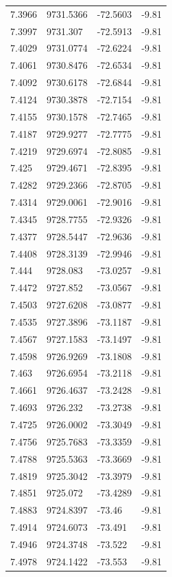 \begin{table}[H]
\begin{tabular}{llll}
7.3966 & 9731.5366 & -72.5603 & -9.81 \\
7.3997 & 9731.307 & -72.5913 & -9.81 \\
7.4029 & 9731.0774 & -72.6224 & -9.81 \\
7.4061 & 9730.8476 & -72.6534 & -9.81 \\
7.4092 & 9730.6178 & -72.6844 & -9.81 \\
7.4124 & 9730.3878 & -72.7154 & -9.81 \\
7.4155 & 9730.1578 & -72.7465 & -9.81 \\
7.4187 & 9729.9277 & -72.7775 & -9.81 \\
7.4219 & 9729.6974 & -72.8085 & -9.81 \\
7.425 & 9729.4671 & -72.8395 & -9.81 \\
7.4282 & 9729.2366 & -72.8705 & -9.81 \\
7.4314 & 9729.0061 & -72.9016 & -9.81 \\
7.4345 & 9728.7755 & -72.9326 & -9.81 \\
7.4377 & 9728.5447 & -72.9636 & -9.81 \\
7.4408 & 9728.3139 & -72.9946 & -9.81 \\
7.444 & 9728.083 & -73.0257 & -9.81 \\
7.4472 & 9727.852 & -73.0567 & -9.81 \\
7.4503 & 9727.6208 & -73.0877 & -9.81 \\
7.4535 & 9727.3896 & -73.1187 & -9.81 \\
7.4567 & 9727.1583 & -73.1497 & -9.81 \\
7.4598 & 9726.9269 & -73.1808 & -9.81 \\
7.463 & 9726.6954 & -73.2118 & -9.81 \\
7.4661 & 9726.4637 & -73.2428 & -9.81 \\
7.4693 & 9726.232 & -73.2738 & -9.81 \\
7.4725 & 9726.0002 & -73.3049 & -9.81 \\
7.4756 & 9725.7683 & -73.3359 & -9.81 \\
7.4788 & 9725.5363 & -73.3669 & -9.81 \\
7.4819 & 9725.3042 & -73.3979 & -9.81 \\
7.4851 & 9725.072 & -73.4289 & -9.81 \\
7.4883 & 9724.8397 & -73.46 & -9.81 \\
7.4914 & 9724.6073 & -73.491 & -9.81 \\
7.4946 & 9724.3748 & -73.522 & -9.81 \\
7.4978 & 9724.1422 & -73.553 & -9.81 \\

\end{tabular}
\end{table}
